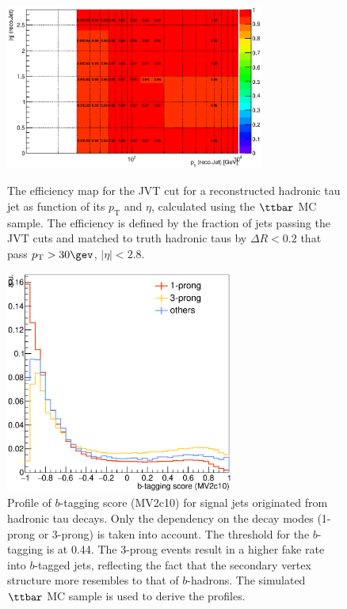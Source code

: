 \begin{figure}[htbp]
  \begin{center}
    \begin{minipage}[t]{.45\textwidth}
      \centering
      \includegraphics[width=85mm]{figures/BGestimation/ObjReplacement/method/tauRF/heff_vs_recoJetPt_recoJetEta.eps}
      \caption{The efficiency map for the JVT cut for a reconstructed hadronic tau jet as function of its $p_{\mathrm{T}}$ and $\eta$, calculated using the $\ttbar$ MC sample. The efficiency is defined by the fraction of jets passing the JVT cuts and matched to truth hadronic taus by $\Delta R<0.2$ that pass $p_{\mathrm{T}}>30\gev$, $|\eta|<2.8$. }
      \label{fig::BGestimation::objRep::effJVT}
    \end{minipage}
    \hfill
    \begin{minipage}[t]{.45\textwidth}
      \centering
      \includegraphics[width=75mm]{figures/BGestimation/ObjReplacement/method/tauRF/hadTau_bTagScore.eps}
      \caption{Profile of $b$-tagging score (MV2c10) for signal jets originated from hadronic tau decays. Only the dependency on the decay modes (1-prong or 3-prong) is taken into account. The threshold for the $b$-tagging is at 0.44. 
The 3-prong events result in a higher fake rate into $b$-tagged jets, reflecting the fact that the secondary vertex structure more resembles to that of $b$-hadrons. The simulated $\ttbar$ MC sample is used to derive the profiles. }
      \label{fig::BGestimation::objRep::tau_bTagScore}
    \end{minipage}
  \end{center}
\end{figure}

